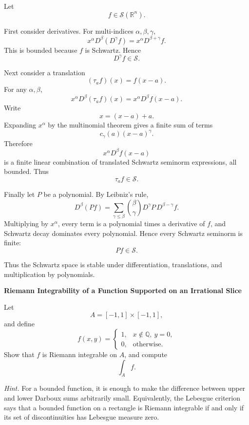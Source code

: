 \begin{solution}
Let
\[
f\in\mathcal S(\mathbb R^n).
\]

First consider derivatives. For multi-indices \(\alpha,\beta,\gamma\),
\[
x^\alpha D^\beta(D^\gamma f)
=
x^\alpha D^{\beta+\gamma}f.
\]
This is bounded because \(f\) is Schwartz. Hence
\[
\boxed{D^\gamma f\in\mathcal S.}
\]

Next consider a translation
\[
(\tau_af)(x)=f(x-a).
\]
For any \(\alpha,\beta\),
\[
x^\alpha D^\beta(\tau_af)(x)
=
x^\alpha D^\beta f(x-a).
\]
Write
\[
x=(x-a)+a.
\]
Expanding \(x^\alpha\) by the multinomial theorem gives a finite sum of terms
\[
c_{\gamma}(a)(x-a)^\gamma.
\]
Therefore
\[
x^\alpha D^\beta f(x-a)
\]
is a finite linear combination of translated Schwartz seminorm expressions, all bounded.
Thus
\[
\boxed{\tau_af\in\mathcal S.}
\]

Finally let \(P\) be a polynomial. By Leibniz's rule,
\[
D^\beta(Pf)
=
\sum_{\gamma\le\beta}
{\beta\choose\gamma}
D^\gamma P\,D^{\beta-\gamma}f.
\]
Multiplying by \(x^\alpha\), every term is a polynomial times a derivative of \(f\), and
Schwartz decay dominates every polynomial. Hence every Schwartz seminorm is finite:
\[
\boxed{Pf\in\mathcal S.}
\]

Thus the Schwartz space is stable under differentiation, translations, and multiplication
by polynomials.
\end{solution}


\begin{problem}[CP-II-0305]
\label{prob:cp-ii-0305}
\textbf{Riemann Integrability of a Function Supported on an Irrational Slice}

\hspace*{1.5em}Let
\[
A=[-1,1]\times[-1,1],
\]
and define
\[
f(x,y)
=
\begin{cases}
1,
& x\notin\mathbb Q,\ y=0,\\[1mm]
0,
& \text{otherwise}.
\end{cases}
\]
Show that \(f\) is Riemann integrable on \(A\), and compute
\[
\int_A f.
\]

\medskip
\noindent\emph{Hint.} For a bounded function, it is enough to make the difference between upper
and lower Darboux sums arbitrarily small. Equivalently, the Lebesgue
criterion says that a bounded function on a rectangle is Riemann integrable
if and only if its set of discontinuities has Lebesgue measure zero.
\end{problem}

